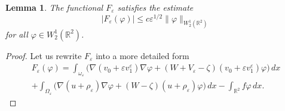 \documentclass[reqno]{amsart}
\theoremstyle{plain}
\newtheorem{lem}{Lemma}
\numberwithin{equation}{section}
\newcommand{\Real}{\mathbb R}
\newcommand{\eps}{\varepsilon}
\renewcommand{\phi}{\varphi}
\renewcommand{\leq}{\leqslant}
\begin{document}
\begin{lem}
The functional $F_\eps$ satisfies the estimate
\begin{equation*}
  |F_\eps(\phi)|\leq c\eps^{1/2}\|\phi\|_{W_2^1(\Real^2)}
\end{equation*}
for all $\phi\in W_2^1(\Real^2)$.
\end{lem}
\begin{proof}
Let us rewrite $F_\eps$ into a more detailed form
\begin{multline}
F_\eps(\phi)=
\int_{\omega_\eps}\Big(\nabla(v_0+\eps v_1^\eps)\nabla \phi+(W+V_\eps-\zeta)(v_0+\eps v_1^\eps) \phi\Big)\,dx
\\+
\int_{\Omega_\eps}\Big(\nabla(u+\rho_\eps)\nabla \phi
            + (W-\zeta)(u+\rho_\eps) \phi\Big)\,dx
            -\int_{\Real^2}f\phi\,dx.
\end{multline}



\end{proof}
\end{document}
